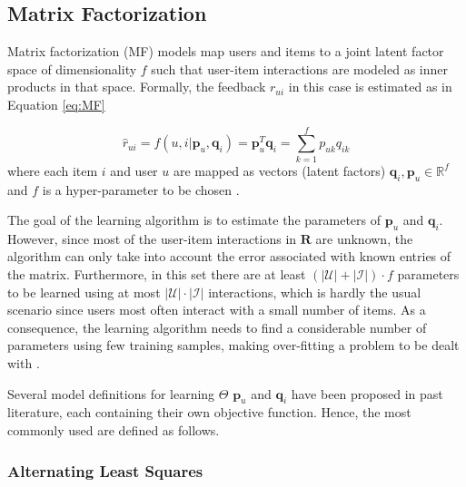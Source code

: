 




\subsection{Matrix Factorization}

    Matrix factorization (MF)  models map users and items to a joint latent factor space of dimensionality $f$ such that user-item interactions are modeled as inner products in that space. Formally, the feedback $r_{ui}$ in this case is estimated as in Equation \ref{eq:MF}
    
    \begin{equation}
        \label{eq:MF}
        \hat{r}_{ui} = f(u,i|\mathbf{p}_u, \mathbf{q}_i) = \mathbf{p}_u^T \mathbf{q}_i = \sum_{k=1}^f p_{uk}q_{ik}
    \end{equation} where each item $i$ and user $u$ are mapped as vectors (latent factors) $\mathbf{q}_i, \mathbf{p}_u \in \mathbb{R}^f$ and $f$ is a hyper-parameter to be chosen \cite{10.1145/3038912.3052569,2009MFTechniques}.
    
    The goal of the learning algorithm is to estimate the parameters of $\mathbf{p}_u$ and $\mathbf{q}_i$. However, since most of the user-item interactions in $\mathbf{R}$ are unknown, the algorithm can only take into account the error associated with known entries of the matrix. Furthermore, in this set there are at least $(|\mathcal{U}|+|\mathcal{I}|)\cdot f$ parameters to be learned using at most $|\mathcal{U}|\cdot |\mathcal{I}|$ interactions, which is hardly the usual scenario since users most often interact with a small number of items. As a consequence, the learning algorithm needs to find a considerable number of parameters using few training samples, making over-fitting a problem to be dealt with \cite{2008ALSWR}.
    
   Several model definitions for learning $\Theta$ $\mathbf{p}_u$ and $\mathbf{q}_i$ have been proposed in past literature, each containing their own objective function. Hence, the most commonly used are defined as follows.
   
   \subsubsection{Alternating Least Squares}
    
